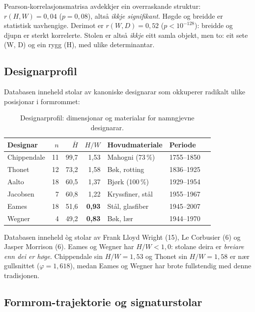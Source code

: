 \documentclass[10pt, a4paper, twocolumn]{article}
\begin{document}
Pearson-korrelasjonsmatrisa avdekkjer ein overraskande struktur: $r(H,W) = 0{,}04$ ($p = 0{,}08$), altså \emph{ikkje signifikant}. Høgde og breidde er statistisk uavhengige. Derimot er $r(W,D) = 0{,}52$ ($p < 10^{-128}$): breidde og djupn er sterkt korrelerte. Stolen er altså \emph{ikkje} eitt samla objekt, men to: eit sete (W, D) og ein rygg (H), med ulike determinantar.


\subsection{Designarprofil}

Databasen inneheld stolar av kanoniske designarar som okkuperer radikalt ulike posisjonar i formrommet:

\begin{table}[H]
\centering
\caption{Designarprofil: dimensjonar og materialar for namngjevne designarar.}
\label{tab:designers}
\begin{tabular}{@{}lrrrlll@{}}
\toprule
\textbf{Designar} & \textbf{$n$} & \textbf{$\bar{H}$} & \textbf{$H/W$} & \textbf{Hovudmateriale} & \textbf{Periode} \\
\midrule
Chippendale & 11 & 99,7 & 1,53 & Mahogni (73\,\%) & 1755--1850 \\
Thonet & 12 & 73,2 & 1,58 & Bøk, rotting & 1836--1925 \\
Aalto & 18 & 60,5 & 1,37 & Bjørk (100\,\%) & 1929--1954 \\
Jacobsen & 7 & 60,8 & 1,22 & Kryssfiner, stål & 1955--1967 \\
Eames & 18 & 51,6 & \textbf{0,93} & Stål, glasfiber & 1945--2007 \\
Wegner & 4 & 49,2 & \textbf{0,83} & Bøk, lær & 1944--1970 \\
\bottomrule
\end{tabular}
\end{table}

Databasen inneheld òg stolar av Frank Lloyd Wright (15), Le Corbusier (6) og Jasper Morrison (6). Eames og Wegner har $H/W < 1{,}0$: stolane deira er \emph{breiare enn dei er høge}. Chippendale sin $H/W = 1{,}53$ og Thonet sin $H/W = 1{,}58$ er nær gullsnittet ($\varphi = 1{,}618$), medan Eames og Wegner har brote fullstendig med denne tradisjonen.


\subsection{Formrom-trajektorie og signaturstolar}
\end{document}
